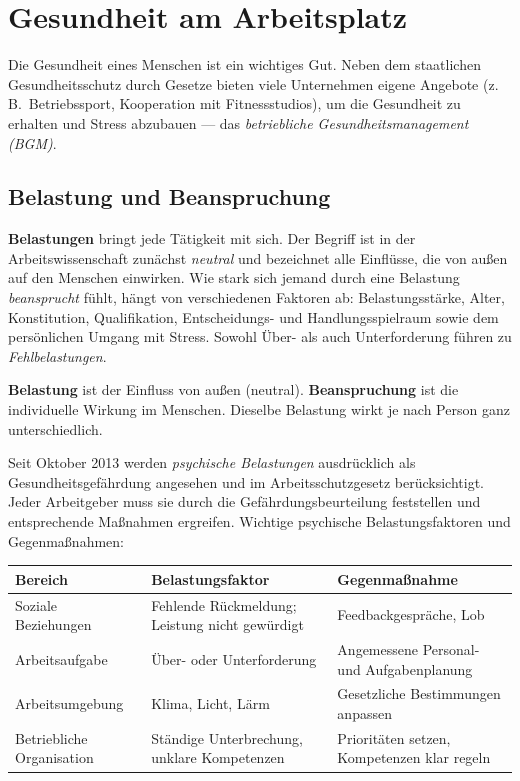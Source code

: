 \documentclass[11pt, a4paper]{article}
\begin{document}
\section{Gesundheit am Arbeitsplatz}

Die Gesundheit eines Menschen ist ein wichtiges Gut. Neben dem staatlichen
Gesundheitsschutz durch Gesetze bieten viele Unternehmen eigene Angebote (z.\,B.\
Betriebssport, Kooperation mit Fitnessstudios), um die Gesundheit zu erhalten und Stress
abzubauen --- das \emph{betriebliche Gesundheitsmanagement (BGM)}.

\subsection{Belastung und Beanspruchung}

\textbf{Belastungen} bringt jede Tätigkeit mit sich. Der Begriff ist in der
Arbeitswissenschaft zunächst \emph{neutral} und bezeichnet alle Einflüsse, die von außen
auf den Menschen einwirken. Wie stark sich jemand durch eine Belastung \emph{beansprucht}
fühlt, hängt von verschiedenen Faktoren ab: Belastungsstärke, Alter, Konstitution,
Qualifikation, Entscheidungs- und Handlungsspielraum sowie dem persönlichen Umgang mit
Stress. Sowohl Über- als auch Unterforderung führen zu \emph{Fehlbelastungen}.

\begin{merksatz}
\textbf{Belastung} ist der Einfluss von außen (neutral). \textbf{Beanspruchung} ist die
individuelle Wirkung im Menschen. Dieselbe Belastung wirkt je nach Person ganz
unterschiedlich.
\end{merksatz}

Seit Oktober 2013 werden \emph{psychische Belastungen} ausdrücklich als
Gesundheitsgefährdung angesehen und im Arbeitsschutzgesetz berücksichtigt. Jeder
Arbeitgeber muss sie durch die Gefährdungsbeurteilung feststellen und entsprechende
Maßnahmen ergreifen. Wichtige psychische Belastungsfaktoren und Gegenmaßnahmen:

\begin{center}
\begin{tabular}{p{4.2cm} p{5.0cm} p{4.2cm}}
\toprule
\textbf{Bereich} & \textbf{Belastungsfaktor} & \textbf{Gegenmaßnahme}\\
\midrule
Soziale Beziehungen & Fehlende Rückmeldung; Leistung nicht gewürdigt & Feedbackgespräche, Lob\\
Arbeitsaufgabe & Über- oder Unterforderung & Angemessene Personal- und Aufgabenplanung\\
Arbeitsumgebung & Klima, Licht, Lärm & Gesetzliche Bestimmungen anpassen\\
Betriebliche Organisation & Ständige Unterbrechung, unklare Kompetenzen & Prioritäten setzen, Kompetenzen klar regeln\\
\bottomrule
\end{tabular}
\end{center}
\end{document}
